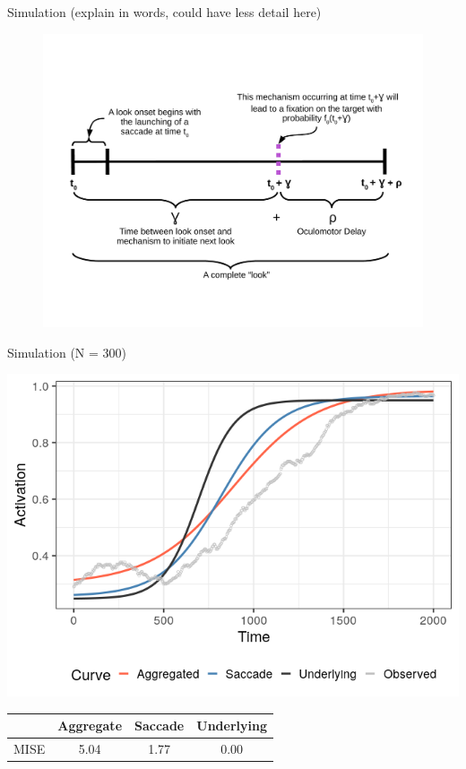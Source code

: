 \documentclass{beamer}
\begin{document}
\begin{frame}{Simulation (explain in words, could have less detail here)}

\vspace{-2.5mm}
\begin{figure}
\centering
\includegraphics[scale=0.4]{look_comp.pdf}
\end{figure}
\end{frame}



\begin{frame}{Simulation (N = 300)}
\begin{center}
\includegraphics[scale=0.4]{img/sac_agg.png}
\end{center}
\vspace{-2mm}
{\scriptsize
\begin{table}[H]
\captionsetup{font=scriptsize}
\centering
\begin{tabular}{rccc}
  \hline
 & Aggregate & Saccade  & Underlying \\ 
  \hline
MISE & 5.04 & 1.77 & 0.00 \\ 
   \hline
\end{tabular}
\end{table}
}
\end{frame}
\end{document}
